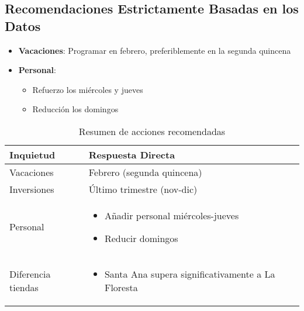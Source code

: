 \documentclass[12pt]{article}
\begin{document}
\subsection{Recomendaciones Estrictamente Basadas en los Datos}

\begin{itemize}
\item \textbf{Vacaciones}: Programar en febrero, preferiblemente en la segunda quincena
\item \textbf{Personal}:
\begin{itemize}
\item Refuerzo los miércoles y jueves
\item Reducción los domingos
\end{itemize}
\end{itemize}

\begin{table}[H]
\centering
\caption{Resumen de acciones recomendadas}
\begin{tabular}{lp{8cm}}
\toprule
\textbf{Inquietud} & \textbf{Respuesta Directa} \\
\midrule
Vacaciones & Febrero (segunda quincena) \\
Inversiones & Último trimestre (nov-dic) \\
Personal & \begin{itemize}
\item Añadir personal miércoles-jueves
\item Reducir domingos
\end{itemize} \\
Diferencia tiendas & \begin{itemize}
\item Santa Ana supera significativamente a La Floresta
\end{itemize} \\
\bottomrule
\end{tabular}
\end{table}
\end{document}

